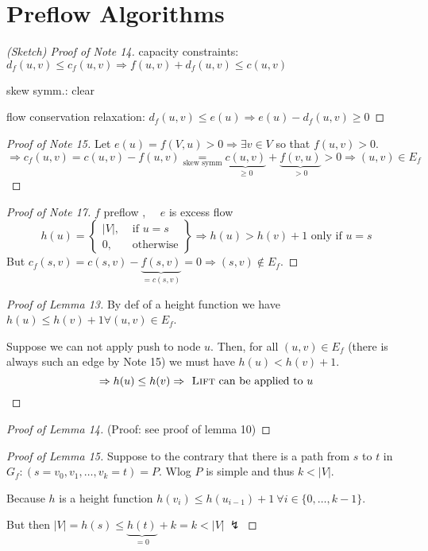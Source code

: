 \documentclass[12pt,oneside,a4paper,parskip=on,fleqn]{scrartcl}
\begin{document}
\section*{Preflow Algorithms}
	\begin{proof}[(Sketch) Proof of Note 14]
		capacity constraints: $d_f(u,v) \leq c_f(u,v) \Rightarrow f(u,v) + d_f(u,v) \leq c(u,v)$

		skew symm.: clear

		flow conservation relaxation: $d_f(u,v)\leq e(u) \Rightarrow e(u) - d_f(u,v) \geq 0$
	\end{proof}

	\begin{proof}[Proof of Note 15]
		Let $e(u) = f(V,u) > 0 \Rightarrow \exists v\in V$ so that $f(u,v) > 0$.
		\[
			\Rightarrow c_f(u,v) = c(u,v) - f(u,v) \underset{\text{skew symm}}{=} \underbrace{c(u,v)}_{\geq 0} + \underbrace{f(v,u)}_{>0} >0 \Rightarrow (u,v)\in E_f
		\]
	\end{proof}

	\begin{proof}[Proof of Note 17]
		$f$ preflow \checkmark, $\quad e$ is excess flow \checkmark
		\[
			h(u) = \left.\begin{cases}
				|V|, &\text{ if } u=s\\
				0, &\text{ otherwise}
			\end{cases}\right\} \Rightarrow h(u) > h(v) + 1 \text{ only if } u=s
		\]
		But $c_f(s,v) = c(s,v) - \underbrace{f(s,v)}_{=c(s,v)} = 0 \Rightarrow (s,v)\not\in E_f$.
	\end{proof}

	\begin{proof}[Proof of Lemma 13]
		By def of a height function we have $h(u) \leq h(v) + 1 \forall (u,v)\in E_f$.

		Suppose we can not apply push to node $u$. Then, for all $(u,v)\in E_f$
		(there is always such an edge by Note 15) we must have $h(u) < h(v) + 1$.
		\[
			\Rightarrow h(u) \leq h(v) \Rightarrow \textsc{ Lift} \text{ can be applied to } u
		\]
	\end{proof}

	\begin{proof}[Proof of Lemma 14]
		(Proof: see proof of lemma 10)
	\end{proof}

	\begin{proof}[Proof of Lemma 15]
		Suppose to the contrary that there is a path from $s$ to $t$ in $G_f: (s=v_0,v_1,\ldots,v_k=t) = P.$ Wlog $P$ is simple and thus $k<|V|$.

		Because $h$ is a height function $h(v_i) \leq h(u_{i-1})+1\ \forall i\in \{0,\ldots,k-1\}$.

		But then $|V| = h(s) \leq \underbrace{h(t)}_{=0} + k = k<|V|\ \lightning$
	\end{proof}
\end{document}
